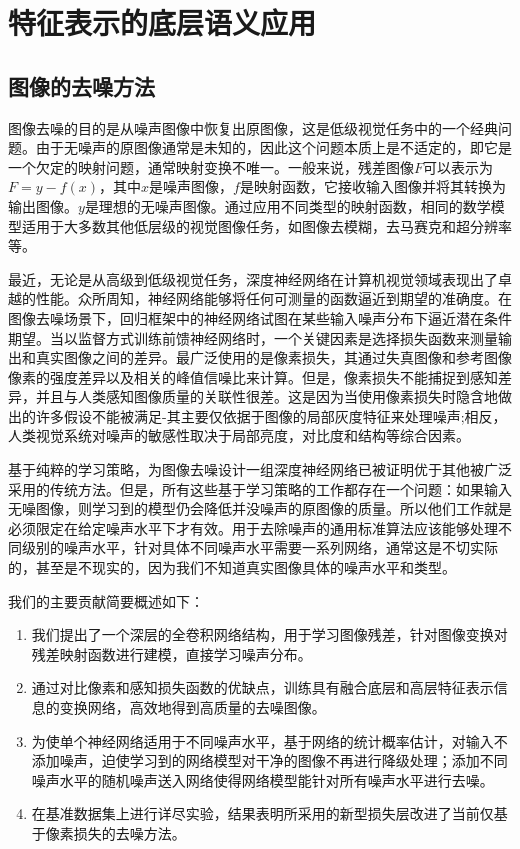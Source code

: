 \chapter{特征表示的底层语义应用}
\label{chap:Denoising}


\section{图像的去噪方法}
图像去噪的目的是从噪声图像中恢复出原图像，这是低级视觉任务中的一个经典问题。由于无噪声的原图像通常是未知的，因此这个问题本质上是不适定的，即它是一个欠定的映射问题，通常映射变换不唯一。一般来说，残差图像$ F $可以表示为$ F = y-f(x)$，其中$ x $是噪声图像，$ f $是映射函数，它接收输入图像并将其转换为输出图像。$ y $是理想的无噪声图像。通过应用不同类型的映射函数，相同的数学模型适用于大多数其他低层级的视觉图像任务，如图像去模糊，去马赛克和超分辨率等。

最近，无论是从高级到低级视觉任务，深度神经网络在计算机视觉领域表现出了卓越的性能。众所周知，神经网络能够将任何可测量的函数逼近到期望的准确度\cite{Hornik1989}。在图像去噪场景下，回归框架中的神经网络试图在某些输入噪声分布下逼近潜在条件期望。当以监督方式训练前馈神经网络时，一个关键因素是选择损失函数来测量输出和真实图像之间的差异。最广泛使用的是像素损失，其通过失真图像和参考图像像素的强度差异以及相关的峰值信噪比\cite{Wang2004}来计算。但是，像素损失不能捕捉到感知差异，并且与人类感知图像质量的关联性很差\cite{Zhao2015,Zhanga2012}。这是因为当使用像素损失时隐含地做出的许多假设不能被满足-其主要仅依据于图像的局部灰度特征来处理噪声;相反，人类视觉系统对噪声的敏感性取决于局部亮度，对比度和结构等综合因素\citep{Wang2004}。

基于纯粹的学习策略，为图像去噪设计一组深度神经网络已被证明优于其他被广泛采用的传统方法\cite{Burger2012}。但是，所有这些基于学习策略的工作都存在一个问题：如果输入无噪图像，则学习到的模型仍会降低并没噪声的原图像的质量。所以他们工作就是必须限定在给定噪声水平下才有效。用于去除噪声的通用标准算法应该能够处理不同级别的噪声水平，针对具体不同噪声水平需要一系列网络，通常这是不切实际的，甚至是不现实的，因为我们不知道真实图像具体的噪声水平和类型。

我们的主要贡献简要概述如下：
\begin{enumerate}
\item 我们提出了一个深层的全卷积网络结构，用于学习图像残差，针对图像变换对残差映射函数进行建模，直接学习噪声分布。
\item 通过对比像素和感知损失函数的优缺点，训练具有融合底层和高层特征表示信息的变换网络，高效地得到高质量的去噪图像。
\item 为使单个神经网络适用于不同噪声水平，基于网络的统计概率估计，对输入不添加噪声，迫使学习到的网络模型对干净的图像不再进行降级处理；添加不同噪声水平的随机噪声送入网络使得网络模型能针对所有噪声水平进行去噪。
\item 在基准数据集上进行详尽实验，结果表明所采用的新型损失层改进了当前仅基于像素损失的去噪方法。
\end{enumerate}

